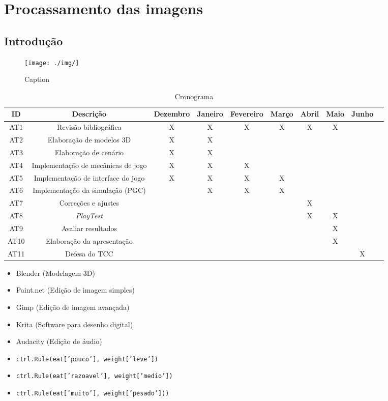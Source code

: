 \chapter{Procassamento das imagens} \label{processamento}
\section{Introdução}

\begin{figure}[H]
    \centering
    \texttt{[image: ./img/]}
    \caption{Caption}
    \label{label} 
\end{figure}


\begin{table}[H]
  \centering
  \caption{Cronograma}
  \begin{adjustbox}{width=\textwidth}
  \begin{tabular}{|c|c|c|c|c|c|c|c|c|c}
  \hline
  ID & Descrição & Dezembro & Janeiro & Fevereiro & Março & Abril & Maio & Junho\\
  \hline
  AT1 & Revisão bibliográfica & X & X & X & X & X & X & \\
  AT2 & Elaboração de modelos 3D & X & X & & & & & \\
  AT3 & Elaboração de cenário & X & X & & & & & \\
  AT4 & Implementação de mecânicas de jogo & X & X & X & & & &\\
  AT5 & Implementação de interface do jogo & X & X & X & X & & &\\
  AT6 & Implementação da simulação (PGC) & & X & X & X & & &\\
  AT7 & Correções e ajustes & & & & & X & &\\
  AT8 & \textit{PlayTest} & & & & & X & X &\\
  AT9 & Avaliar resultados & & & & & & X &\\
  AT10 & Elaboração da apresentação & & & & & & X &\\
  AT11 & Defesa do TCC & & & & & & & X\\
  \hline
  \end{tabular}
  \end{adjustbox}
  \label{table:cronograma}
\end{table}


\begin{itemize}
  \item Blender (Modelagem 3D)
  \item Paint.net (Edição de imagem simples)
  \item Gimp (Edição de imagem avançada)
  \item Krita (Software para desenho digital)
  \item Audacity (Edição de áudio)
\end{itemize}

\begin{itemize}[itemindent=!]
  \item \texttt{ctrl.Rule(eat['pouco'], weight['leve'])}
  \item \texttt{ctrl.Rule(eat['razoavel'], weight['medio'])}
  \item \texttt{ctrl.Rule(eat['muito'], weight['pesado']))}
\end{itemize}